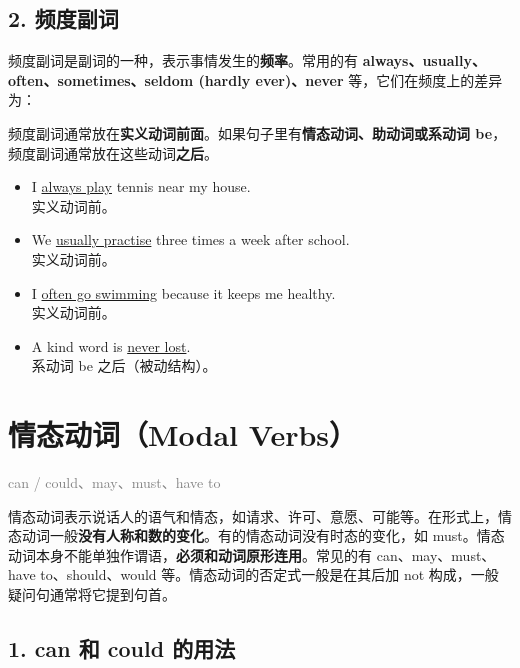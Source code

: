 \documentclass[11pt,a4paper]{ctexart}
\begin{document}
\subsection*{2. 频度副词}

频度副词是副词的一种，表示事情发生的\textbf{频率}。常用的有 \textbf{always、usually、often、sometimes、seldom (hardly ever)、never} 等，它们在频度上的差异为：

\begin{center}\end{center}

频度副词通常放在\textbf{实义动词前面}。如果句子里有\textbf{情态动词、助动词或系动词 be}，频度副词通常放在这些动词\textbf{之后}。

\begin{itemize}[leftmargin=1.4em]
\item I \underline{always play} tennis near my house.\\ 实义动词前。
\item We \underline{usually practise} three times a week after school.\\ 实义动词前。
\item I \underline{often go swimming} because it keeps me healthy.\\ 实义动词前。
\item A kind word is \underline{never lost}.\\ 系动词 be 之后（被动结构）。
\end{itemize}

\section{情态动词（Modal Verbs）}
\noindent\textcolor{gray}{can / could、may、must、have to}\par\smallskip
情态动词表示说话人的语气和情态，如请求、许可、意愿、可能等。在形式上，情态动词一般\textbf{没有人称和数的变化}。有的情态动词没有时态的变化，如 must。情态动词本身不能单独作谓语，\textbf{必须和动词原形连用}。常见的有 can、may、must、have to、should、would 等。情态动词的否定式一般是在其后加 not 构成，一般疑问句通常将它提到句首。

\subsection*{1. can 和 could 的用法}
\end{document}

